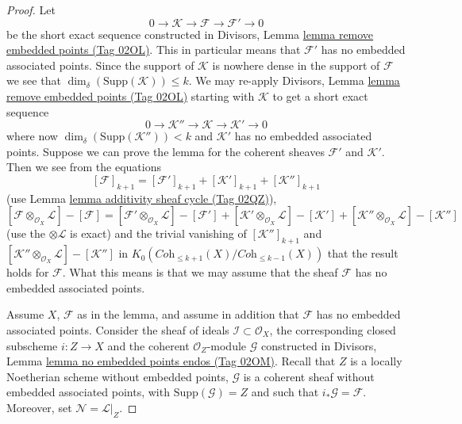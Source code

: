\documentclass{amsart}
\theoremstyle{plain}
\theoremstyle{definition}
\theoremstyle{remark}
\numberwithin{equation}{subsection}
\begin{document}
\begin{proof}
Let
$$
0 \to \mathcal{K} \to \mathcal{F} \to \mathcal{F}' \to 0
$$
be the short exact sequence constructed in
Divisors, Lemma \href{https://stacks.math.columbia.edu/tag/02OL}{lemma remove embedded points (Tag 02OL)}.
This in particular means that $\mathcal{F}'$ has no embedded
associated points.
Since the support of $\mathcal{K}$ is nowhere dense in the
support of $\mathcal{F}$ we see that
$\dim_\delta(\text{Supp}(\mathcal{K})) \leq k$. We may
re-apply
Divisors, Lemma \href{https://stacks.math.columbia.edu/tag/02OL}{lemma remove embedded points (Tag 02OL)}
starting with $\mathcal{K}$ to get a short exact sequence
$$
0 \to \mathcal{K}'' \to \mathcal{K} \to \mathcal{K}' \to 0
$$
where now $\dim_\delta(\text{Supp}(\mathcal{K}'')) < k$
and $\mathcal{K}'$ has no embedded associated points.
Suppose we can prove the lemma for the coherent sheaves
$\mathcal{F}'$ and $\mathcal{K}'$. Then we see
from the equations
$$
[\mathcal{F}]_{k + 1}
=
[\mathcal{F}']_{k + 1}
+ [\mathcal{K}']_{k + 1}
+ [\mathcal{K}'']_{k + 1}
$$
(use Lemma \href{https://stacks.math.columbia.edu/tag/02QZ}{lemma additivity sheaf cycle (Tag 02QZ)}),
$$
[\mathcal{F} \otimes_{\mathcal{O}_X} \mathcal{L}]
-
[\mathcal{F}]
=
[\mathcal{F}' \otimes_{\mathcal{O}_X} \mathcal{L}]
-
[\mathcal{F}']
+
[\mathcal{K}' \otimes_{\mathcal{O}_X} \mathcal{L}]
-
[\mathcal{K}']
+
[\mathcal{K}'' \otimes_{\mathcal{O}_X} \mathcal{L}]
-
[\mathcal{K}'']
$$
(use the $\otimes \mathcal{L}$ is exact)
and the trivial vanishing of $[\mathcal{K}'']_{k + 1}$ and
$[\mathcal{K}'' \otimes_{\mathcal{O}_X} \mathcal{L}]
- [\mathcal{K}'']$ in
$K_0(\textit{Coh}_{\leq k + 1}(X)/\textit{Coh}_{\leq k - 1}(X))$
that the result holds
for $\mathcal{F}$. What this means is that we may assume that
the sheaf $\mathcal{F}$ has no embedded associated points.

\medskip\noindent
Assume $X$, $\mathcal{F}$ as in the lemma, and assume in addition
that $\mathcal{F}$ has no embedded associated points. Consider the
sheaf of ideals $\mathcal{I} \subset \mathcal{O}_X$, the corresponding
closed subscheme $i : Z \to X$ and the coherent $\mathcal{O}_Z$-module
$\mathcal{G}$ constructed in
Divisors, Lemma \href{https://stacks.math.columbia.edu/tag/02OM}{lemma no embedded points endos (Tag 02OM)}.
Recall that $Z$ is a locally Noetherian scheme without embedded points,
$\mathcal{G}$ is a coherent sheaf without embedded
associated points, with $\text{Supp}(\mathcal{G}) = Z$
and such that $i_*\mathcal{G} = \mathcal{F}$.
Moreover, set $\mathcal{N} = \mathcal{L}|_Z$.


\end{proof}
\end{document}
